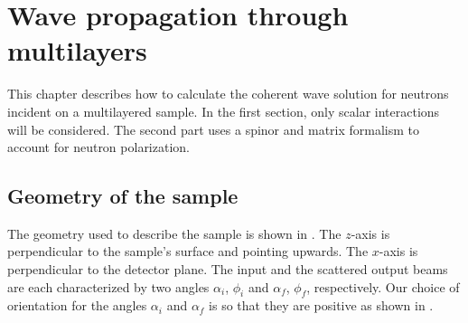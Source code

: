 

\chapter{Wave propagation through multilayers}  

This chapter describes how to calculate the coherent wave solution for neutrons incident on a multilayered sample. In the first section, only scalar interactions will be considered. The second part uses a spinor and matrix formalism to account for neutron polarization.



\section{Geometry of the sample}

\noindent The geometry used to describe the sample is shown in . The $z$-axis is perpendicular to the sample's
surface and pointing upwards. The $x$-axis  is perpendicular to the
detector plane. The input and the
scattered output beams are each characterized by two angles
$\alpha_i$, $\phi_i$ and $\alpha_f$, $\phi_f$, respectively. Our choice of orientation for the
angles $\alpha_i$ and $\alpha_f$ is so that they are positive as shown in . \\

